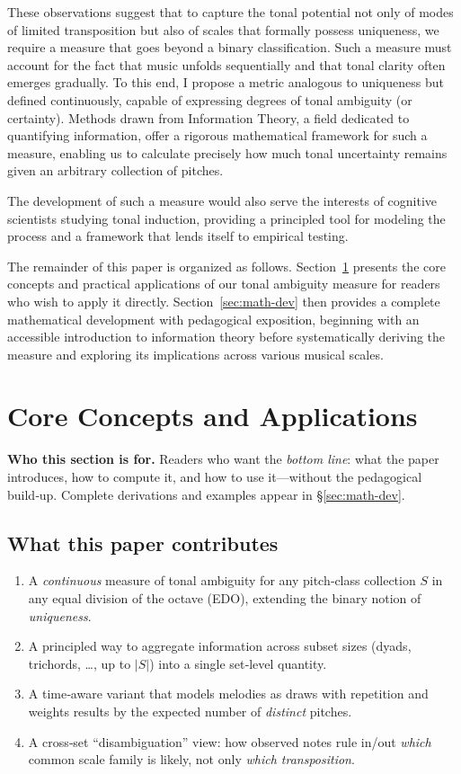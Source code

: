 \documentclass[10pt,twocolumn]{article}
\numberwithin{equation}{section} %
\begin{document}
    These observations suggest that to capture the tonal potential not only of modes of limited transposition but also of scales that formally possess uniqueness, we require a measure that goes beyond a binary classification.
    Such a measure must account for the fact that music unfolds sequentially and that tonal clarity often emerges gradually.
    To this end, I propose a metric analogous to uniqueness but defined continuously, capable of expressing degrees of tonal ambiguity (or certainty).
    Methods drawn from Information Theory, a field dedicated to quantifying information, offer a rigorous mathematical framework for such a measure, enabling us to calculate precisely how much tonal uncertainty remains given an arbitrary collection of pitches.

    The development of such a measure would also serve the interests of cognitive scientists studying tonal induction, providing a principled tool for modeling the process and a framework that lends itself to empirical testing.



    The remainder of this paper is organized as follows.
    Section~\ref{sec:core} presents the core concepts and practical applications of our tonal ambiguity measure for readers who wish to apply it directly.
    Section~\ref{sec:math-dev} then provides a complete mathematical development with pedagogical exposition, beginning with an accessible introduction to information theory before systematically deriving the measure and exploring its implications across various musical scales.

    \section{Core Concepts and Applications}\label{sec:core}

    \noindent\textbf{Who this section is for.}
    Readers who want the \emph{bottom line}: what the paper introduces, how to compute it, and how to use it—without the pedagogical build‑up. Complete derivations and examples appear in \S\ref{sec:math-dev}.

    \subsection*{What this paper contributes}
    \begin{enumerate}
        \item A \emph{continuous} measure of tonal ambiguity for any pitch‑class collection $S$ in any equal division of the octave (EDO), extending the binary notion of \emph{uniqueness}.
        \item A principled way to aggregate information across subset sizes (dyads, trichords, \dots, up to $|S|$) into a single set‑level quantity.
        \item A time‑aware variant that models melodies as draws with repetition and weights results by the expected number of \emph{distinct} pitches.
        \item A cross‑set ``disambiguation'' view: how observed notes rule in/out \emph{which} common scale family is likely, not only \emph{which transposition}.
    \end{enumerate}
\end{document}
